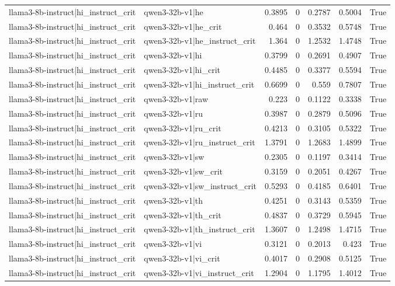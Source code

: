 \begin{table}
\begin{tabular}{l l r r r r l}
llama3-8b-instruct|hi_instruct_crit & qwen3-32b-v1|he & 0.3895 & 0 & 0.2787 & 0.5004 & True \\
llama3-8b-instruct|hi_instruct_crit & qwen3-32b-v1|he_crit & 0.464 & 0 & 0.3532 & 0.5748 & True \\
llama3-8b-instruct|hi_instruct_crit & qwen3-32b-v1|he_instruct_crit & 1.364 & 0 & 1.2532 & 1.4748 & True \\
llama3-8b-instruct|hi_instruct_crit & qwen3-32b-v1|hi & 0.3799 & 0 & 0.2691 & 0.4907 & True \\
llama3-8b-instruct|hi_instruct_crit & qwen3-32b-v1|hi_crit & 0.4485 & 0 & 0.3377 & 0.5594 & True \\
llama3-8b-instruct|hi_instruct_crit & qwen3-32b-v1|hi_instruct_crit & 0.6699 & 0 & 0.559 & 0.7807 & True \\
llama3-8b-instruct|hi_instruct_crit & qwen3-32b-v1|raw & 0.223 & 0 & 0.1122 & 0.3338 & True \\
llama3-8b-instruct|hi_instruct_crit & qwen3-32b-v1|ru & 0.3987 & 0 & 0.2879 & 0.5096 & True \\
llama3-8b-instruct|hi_instruct_crit & qwen3-32b-v1|ru_crit & 0.4213 & 0 & 0.3105 & 0.5322 & True \\
llama3-8b-instruct|hi_instruct_crit & qwen3-32b-v1|ru_instruct_crit & 1.3791 & 0 & 1.2683 & 1.4899 & True \\
llama3-8b-instruct|hi_instruct_crit & qwen3-32b-v1|sw & 0.2305 & 0 & 0.1197 & 0.3414 & True \\
llama3-8b-instruct|hi_instruct_crit & qwen3-32b-v1|sw_crit & 0.3159 & 0 & 0.2051 & 0.4267 & True \\
llama3-8b-instruct|hi_instruct_crit & qwen3-32b-v1|sw_instruct_crit & 0.5293 & 0 & 0.4185 & 0.6401 & True \\
llama3-8b-instruct|hi_instruct_crit & qwen3-32b-v1|th & 0.4251 & 0 & 0.3143 & 0.5359 & True \\
llama3-8b-instruct|hi_instruct_crit & qwen3-32b-v1|th_crit & 0.4837 & 0 & 0.3729 & 0.5945 & True \\
llama3-8b-instruct|hi_instruct_crit & qwen3-32b-v1|th_instruct_crit & 1.3607 & 0 & 1.2498 & 1.4715 & True \\
llama3-8b-instruct|hi_instruct_crit & qwen3-32b-v1|vi & 0.3121 & 0 & 0.2013 & 0.423 & True \\
llama3-8b-instruct|hi_instruct_crit & qwen3-32b-v1|vi_crit & 0.4017 & 0 & 0.2908 & 0.5125 & True \\
llama3-8b-instruct|hi_instruct_crit & qwen3-32b-v1|vi_instruct_crit & 1.2904 & 0 & 1.1795 & 1.4012 & True \\

\end{tabular}
\end{table}
